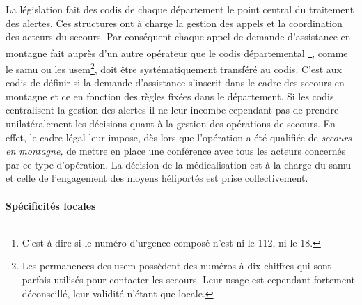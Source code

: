 La législation fait des \ac{codis} de chaque département le point
central du traitement des alertes. Ces structures ont à charge la
gestion des appels et la coordination des acteurs du secours. Par
conséquent chaque appel de demande d'assistance en montagne fait
auprès d'un autre opérateur que le \ac{codis} départemental
\footnote{C'est-à-dire si le numéro d'urgence composé n'est ni le 112,
  ni le 18.}, comme le \ac{samu} ou les \ac{usem}\footnote{Les
  permanences des \ac{usem} possèdent des numéros à dix chiffres qui
  sont parfois utilisés pour contacter les secours. Leur usage est
  cependant fortement déconseillé, leur validité n'étant que locale.},
doit être systématiquement transféré au \ac{codis}. C'est aux
\ac{codis} de définir si la demande d'assistance s'inscrit dans le
cadre des secours en montagne et ce en fonction des règles fixées dans
le département.  Si les \ac{codis} centralisent la gestion des alertes
il ne leur incombe cependant pas de prendre unilatéralement les
décisions quant à la gestion des opérations de secours. En effet, le
cadre légal leur impose, dès lors que l’opération a été qualifiée de
\emph{secours en montagne,} de mettre en place une conférence avec
tous les acteurs concernés par ce type d'opération. La décision de la
médicalisation est à la charge du \ac{samu} et celle de l'engagement
des moyens héliportés est prise collectivement.

\paragraph{Spécificités locales}

